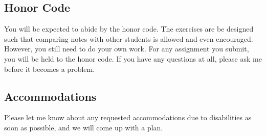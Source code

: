 \documentclass{tufte-handout}
\begin{document}
\subsection*{Honor Code}
\label{sec-8-1}

You will be expected to abide by the honor code. The exercises are be designed such that comparing notes with other students is allowed and even encouraged.  However, you still need to do your own work.  For any assignment you submit, you will be held to the honor code. If you have any questions at all, please ask me before it becomes a problem.
\subsection*{Accommodations}
\label{sec-8-2}

Please let me know about any requested accommodations due to disabilities as soon as possible, and we will come up with a plan.
\end{document}
